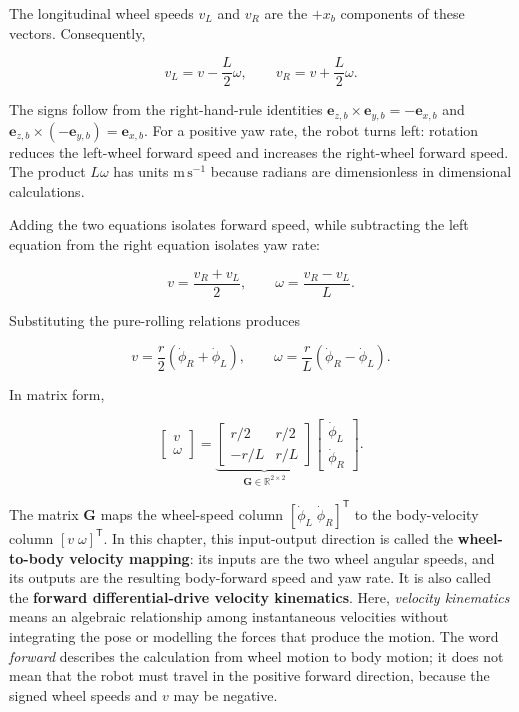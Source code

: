 \documentclass[
  australian,
  12pt,
  letterpaper,
  DIV=11,
  numbers=noendperiod,
  twoside]{scrreprt}
\begin{document}
The longitudinal wheel speeds \(v_L\) and \(v_R\) are the \(+x_b\)
components of these vectors. Consequently,

\[
\boxed{
v_L=v-\frac{L}{2}\omega,
\qquad
v_R=v+\frac{L}{2}\omega
}.
\]

The signs follow from the right-hand-rule identities
\(\mathbf e_{z,b}\times\mathbf e_{y,b}=-\mathbf e_{x,b}\) and
\(\mathbf e_{z,b}\times(-\mathbf e_{y,b})=\mathbf e_{x,b}\). For a
positive yaw rate, the robot turns left: rotation reduces the left-wheel
forward speed and increases the right-wheel forward speed. The product
\(L\omega\) has units \(\mathrm{m\,s^{-1}}\) because radians are
dimensionless in dimensional calculations.

Adding the two equations isolates forward speed, while subtracting the
left equation from the right equation isolates yaw rate:

\[
v=\frac{v_R+v_L}{2},
\qquad
\omega=\frac{v_R-v_L}{L}.
\]

Substituting the pure-rolling relations produces

\[
\boxed{
v
=
\frac{r}{2}\left(\dot\phi_R+\dot\phi_L\right),
\qquad
\omega
=
\frac{r}{L}\left(\dot\phi_R-\dot\phi_L\right)
}.
\]

In matrix form,

\[
\boxed{
\begin{bmatrix}
v\\
\omega
\end{bmatrix}
=
\underbrace{
\begin{bmatrix}
r/2&r/2\\
-r/L&r/L
\end{bmatrix}
}_{\mathbf G\in\mathbb R^{2\times2}}
\begin{bmatrix}
\dot\phi_L\\
\dot\phi_R
\end{bmatrix}
}.
\]

The matrix \(\mathbf G\) maps the wheel-speed column
\([\dot\phi_L\;\dot\phi_R]^\mathsf T\) to the body-velocity column
\([v\;\omega]^\mathsf T\). In this chapter, this input-output direction
is called the \textbf{wheel-to-body velocity mapping}: its inputs are
the two wheel angular speeds, and its outputs are the resulting
body-forward speed and yaw rate. It is also called the \textbf{forward
differential-drive velocity kinematics}. Here, \emph{velocity
kinematics} means an algebraic relationship among instantaneous
velocities without integrating the pose or modelling the forces that
produce the motion. The word \emph{forward} describes the calculation
from wheel motion to body motion; it does not mean that the robot must
travel in the positive forward direction, because the signed wheel
speeds and \(v\) may be negative.
\end{document}
